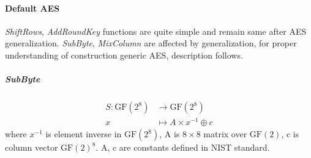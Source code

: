 \documentclass[11pt,oneside,final]{fithesis2}
\newcommand{\gfe}{\ensuremath{\text{GF}\left(2^8\right)}}
\begin{document}
	\paragraph*{Default AES}
	\emph{ShiftRows}, \emph{AddRoundKey} functions are quite simple and remain same after AES generalization. \emph{SubByte}, \emph{MixColumn} are affected by 
	generalization, for proper understanding of construction generic AES, description follows.

	\subparagraph*{SubByte}\label{sec:aes_subbyte}
	\begin{equation}
	\begin{aligned}
	S: \gfe         & \longrightarrow  \gfe\\
	x               & \longmapsto A \times x^{-1} \oplus c
	\end{aligned}
	\end{equation}
	where $x^{-1}$ is element inverse in $\gfe$, A is $8 \times 8$ matrix over $\text{GF}(2)$, c is column vector $\text{GF}(2)^8$. A, c are constants defined in NIST standard.
\end{document}

